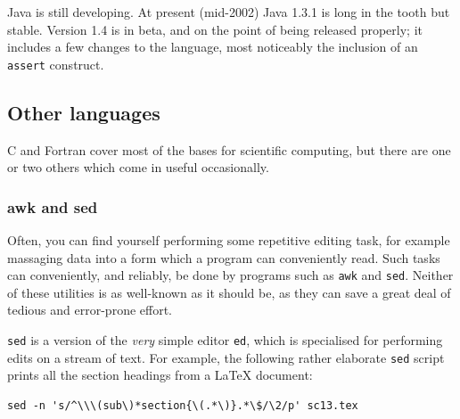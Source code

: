 \documentclass[11pt,oneside,chapters]{starlink}
\begin{document}
Java is still developing.  At present (mid-2002) Java
1.3.1 is long in the tooth but stable.  Version 1.4 is in
beta, and on the point of being released properly; it
includes a few changes to the language, most noticeably
the inclusion of an \texttt{assert} construct.


\subsection{Other languages}
\label{s:otherlang}

C and Fortran cover most of the bases for scientific computing, but
there are one or two others which come in useful occasionally.

\subsubsection{awk and sed}
\label{s:sedawk}

Often, you can find yourself performing some repetitive
editing task, for example massaging data into a form
which a program can conveniently read.  Such tasks can
conveniently, and reliably, be done by programs such as
\texttt{awk} and \texttt{sed}.  Neither of these
utilities is as well-known as it should be, as they can
save a great deal of tedious and error-prone effort.

\texttt{sed} is a version of the \emph{very}
simple editor \texttt{ed}, which is specialised for
performing edits on a stream of text.  For example, the
following rather elaborate \texttt{sed} script
prints all the section headings from a LaTeX document:

\begin{verbatim}
sed -n 's/^\\\(sub\)*section{\(.*\)}.*\$/\2/p' sc13.tex
\end{verbatim}
\end{document}
